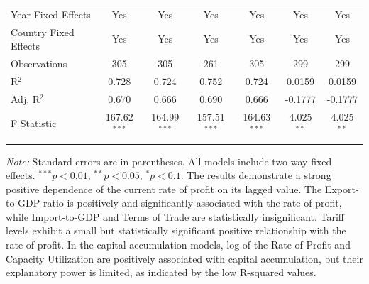 \documentclass[10pt]{article}
\begin{document}
\begin{table}[!htbp]
\begin{tabular}{@{\extracolsep{4pt}}lcccccc}
    Year Fixed Effects & Yes & Yes & Yes & Yes & Yes & Yes \\
    Country Fixed Effects & Yes & Yes & Yes & Yes & Yes & Yes \\
    Observations & 305 & 305 & 261 & 305 & 299 & 299 \\
    R$^{2}$ & 0.728 & 0.724 & 0.752 & 0.724 & 0.0159 & 0.0159 \\
    Adj. R$^{2}$ & 0.670 & 0.666 & 0.690 & 0.666 & -0.1777 & -0.1777 \\
    F Statistic & 167.62$^{***}$ & 164.99$^{***}$ & 157.51$^{***}$ & 164.63$^{***}$ & 4.025$^{**}$  & 4.025$^{**}$\\
    \hline
    \hline \\[-1.5ex]
  \end{tabular} 
  \begin{minipage}[t]{\textwidth}
  \small
  \textit{Note:} Standard errors are in parentheses. All models include two-way fixed effects. 
  $^{***}p<0.01$, $^{**}p<0.05$, $^{*}p<0.1$. The results demonstrate a strong positive dependence of the current rate of profit on its lagged value. The Export-to-GDP ratio is positively and significantly associated with the rate of profit, while Import-to-GDP and Terms of Trade are statistically insignificant. Tariff levels exhibit a small but statistically significant positive relationship with the rate of profit. In the capital accumulation models, log of the Rate of Profit and Capacity Utilization are positively associated with capital accumulation, but their explanatory power is limited, as indicated by the low R-squared values.
  \end{minipage}
\end{table}
\end{document}
